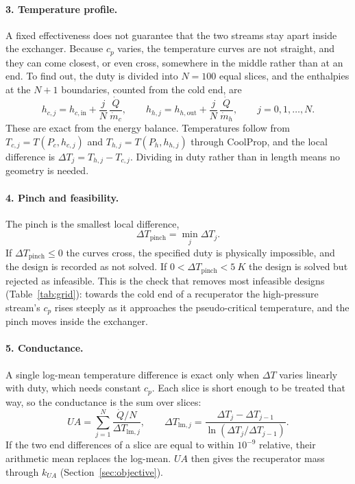 \paragraph{3. Temperature profile.} A fixed effectiveness does not guarantee that the two streams stay apart inside the exchanger. Because $c_p$ varies, the temperature curves are not straight, and they can come closest, or even cross, somewhere in the middle rather than at an end. To find out, the duty is divided into $N = 100$ equal slices, and the enthalpies at the $N+1$ boundaries, counted from the cold end, are
\begin{equation}
h_{c,j} = h_{c,\mathrm{in}} + \frac{j}{N}\,\frac{\dot Q}{\dot m_c}, \qquad h_{h,j} = h_{h,\mathrm{out}} + \frac{j}{N}\,\frac{\dot Q}{\dot m_h}, \qquad j = 0, 1, \dots, N.
\end{equation}
These are exact from the energy balance. Temperatures follow from $T_{c,j} = T(P_c, h_{c,j})$ and $T_{h,j} = T(P_h, h_{h,j})$ through CoolProp, and the local difference is $\Delta T_j = T_{h,j} - T_{c,j}$. Dividing in duty rather than in length means no geometry is needed.

\paragraph{4. Pinch and feasibility.} The pinch is the smallest local difference,
\begin{equation}
\Delta T_\mathrm{pinch} = \min_j \Delta T_j .
\end{equation}
If $\Delta T_\mathrm{pinch} \le 0$ the curves cross, the specified duty is physically impossible, and the design is recorded as not solved. If $0 < \Delta T_\mathrm{pinch} < \SI{5}{K}$ the design is solved but rejected as infeasible. This is the check that removes most infeasible designs (Table~\ref{tab:grid}): towards the cold end of a recuperator the high-pressure stream's $c_p$ rises steeply as it approaches the pseudo-critical temperature, and the pinch moves inside the exchanger.

\paragraph{5. Conductance.} A single log-mean temperature difference is exact only when $\Delta T$ varies linearly with duty, which needs constant $c_p$. Each slice is short enough to be treated that way, so the conductance is the sum over slices:
\begin{equation}
UA = \sum_{j=1}^{N} \frac{\dot Q/N}{\Delta T_{\mathrm{lm},j}}, \qquad \Delta T_{\mathrm{lm},j} = \frac{\Delta T_j - \Delta T_{j-1}}{\ln(\Delta T_j/\Delta T_{j-1})}.
\end{equation}
If the two end differences of a slice are equal to within $10^{-9}$ relative, their arithmetic mean replaces the log-mean. $UA$ then gives the recuperator mass through $k_{UA}$ (Section~\ref{sec:objective}).

